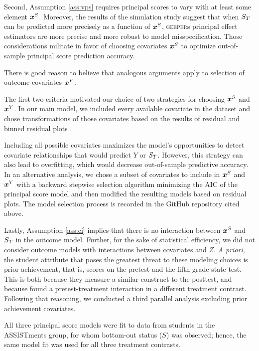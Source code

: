 \documentclass[]{article}
\begin{document}
Second, Assumption \ref{ass:vps} requires principal scores to vary with at least some element $\bm{x}^S$. Moreover, the results of the simulation study suggest that when $S_T$ can be predicted more precisely as a function of $\bm{x}^S$, \textsc{geeper}s principal effect estimators are more precise and more robust to model misspecification.
Those considerations militate in favor of choosing covariates $\bm{x}^S$ to optimize out-of-sample principal score prediction accuracy.

There is good reason to believe that analogous arguments apply to selection of outcome covariates $\bm{x}^Y$.

The first two criteria motivated our choice of two strategies for choosing $\bm{x}^S$ and $\bm{x}^Y$.
In our main model, we included every available covariate in the dataset and chose transformations of those covariates based on the results of residual and binned residual plots \citep{arm}.

Including all possible covariates maximizes the model's opportunities to detect covariate relationships that would predict $Y$ or $S_T$.
However, this strategy can also lead to overfitting, which would decrease out-of-sample predictive accuracy.
In an alternative analysis, we chose a subset of covariates to include in $\bm{x}^S$ and $\bm{x}^Y$ with a backward stepwise selection algorithm minimizing the AIC \citep{aic} of the principal score model and then modified the resulting models based on residual plots.
The model selection process is recorded in the GitHub repository cited above.

Lastly, Assumption \ref{ass:ci} implies that there is no interaction between $\bm{x}^S$ and $S_T$ in the outcome model. Further, for the sake of statistical efficiency, we did not consider outcome models with interactions between covariates and $Z$.
\emph{A priori}, the student attribute that poses the greatest threat to these modeling choices is prior achievement, that is, scores on the pretest and the fifth-grade state test.
This is both because they measure a similar construct to the posttest, and because \cite{impactPaper} found a pretest-treatment interaction in a different treatment contrast.
Following that reasoning, we conducted a third parallel analysis excluding prior achievement covariates.%

All three principal score models were fit to data from students in the ASSISTments group, for whom bottom-out status ($S$) was observed; hence, the same model fit was used for all three treatment contrasts.
\end{document}
